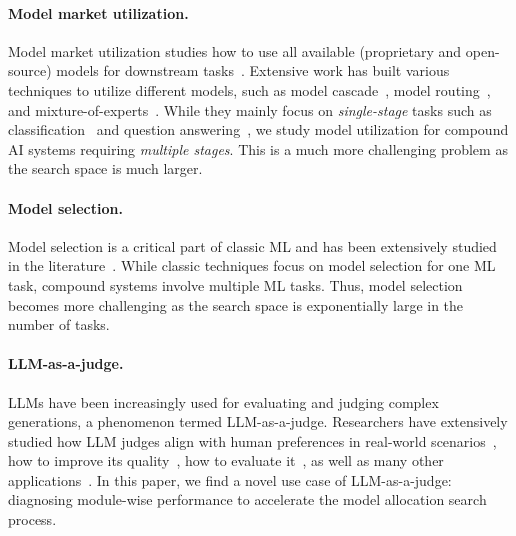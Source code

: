 \paragraph{Model market utilization.} Model market utilization studies how to use all available (proprietary and open-source) models for downstream tasks~\cite{lu2024merge,ramirez2024optimising,miao2023towards}. Extensive work has built various techniques to utilize different models, such as model cascade~\cite{chen2023frugalgpt}, model routing~\cite{hu2024routerbench,stripelis2024tensoropera}, and mixture-of-experts~\cite{wang2024mixture}. While they mainly focus on  \textit{single-stage} tasks such as classification~\cite{chen2020frugalml,huang2025thriftllm} and question answering~\cite{chen2023frugalgpt,shekhar2024towards}, we study model utilization for compound AI systems requiring \textit{multiple stages}. This is a much more challenging problem as the search space is much larger. 

\paragraph{Model selection.} Model selection is a critical part of classic ML and has been extensively studied in the literature~\cite{kohavi1995study,akaike1974new,elsken2019neural}. %
While classic techniques focus on model selection for one ML task, compound systems involve multiple ML tasks. Thus, model selection becomes more challenging as the search space is exponentially large in the number of tasks.  

\paragraph{LLM-as-a-judge.} LLMs have been increasingly used for evaluating and judging complex generations, a phenomenon termed LLM-as-a-judge. Researchers have extensively studied how LLM judges align with human preferences in real-world scenarios~\cite{zheng2023judging,shankar2024validates}, how to improve its quality~\cite{kim2023prometheus}, how to evaluate it~\cite{chiang2024chatbot,chen2024mllm,zeng2023evaluating}, as well as many other applications~\cite{johri2025evaluation,dhole2024conqret,gu2024survey,zhou2024llm}. In this paper, we find a novel use case of LLM-as-a-judge: diagnosing module-wise performance to accelerate the model allocation search process. 
